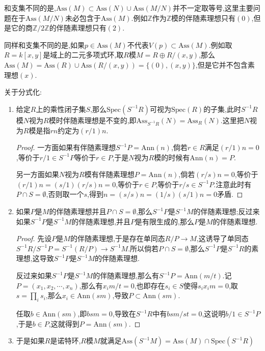 和支集不同的是,$\mathrm{Ass}(M)\subset\mathrm{Ass}(N)\cup\mathrm{Ass}(M/N)$并不一定取等号,这里主要问题在于$\mathrm{Ass}(M/N)$未必包含于$\mathrm{Ass}(M)$.例如$\mathbb{Z}$作为$\mathbb{Z}$模的伴随素理想只有$(0)$,但是它的商$\mathbb{Z}/2\mathbb{Z}$的伴随素理想只有$(2)$.

同样和支集不同的是,如果$p\in\mathrm{Ass}(M)$不代表$V(p)\subset\mathrm{Ass}(M)$.例如取$R=k[x,y]$是域上的二元多项式环,取$R$模$M=R\oplus R/(x,y)$,那么$\mathrm{Ass}(M)=\mathrm{Ass}(R)\cup\mathrm{Ass}(R/(x,y))=\{(0),(x,y)\}$,但是它并不包含素理想$(x)$.

关于分式化:
\begin{enumerate}
	\item 给定$R$上的乘性闭子集$S$,那么$\mathrm{Spec}(S^{-1}R)$可视为$\mathrm{Spec}(R)$的子集,此时$S^{-1}R$模$N$视为$R$模时伴随素理想是不变的,即$\mathrm{Ass}_{S^{-1}R}(N)=\mathrm{Ass}_R(N)$.这里把$N$视为$R$模是指$rn$约定为$(r/1)n$.
	\begin{proof}
		
		一方面如果有伴随素理想$S^{-1}P=\mathrm{Ann}(n)$,倘若$r\in R$满足$(r/1)n=0$,等价于$r/1\in S^{-1}P$等价于$r\in P$,于是$N$视为$R$模的时候有$\mathrm{Ann}(n)=P$.
		
		另一方面如果$N$视为$R$模有伴随素理想$P=\mathrm{Ann}(n)$,倘若$(r/s)n=0$,等价于$(r/1)n=(s/1)(r/s)n=0$,等价于$r\in P$,等价于$r/s\in S^{-1}P$.注意此时有$P\cap S=\emptyset$,否则取一个$s$,得到$n=(s/s)n=(1/s)(s/1)n=0$矛盾.
	\end{proof}
	\item 如果$P$是$M$的伴随素理想并且$P\cap S=\emptyset$,那么$S^{-1}P$是$S^{-1}M$的伴随素理想;反过来如果$S^{-1}P$是$S^{-1}M$的伴随素理想,并且$P$是有限生成的,那么$P$是$M$的伴随素理想.
	\begin{proof}
		
		先设$P$是$M$的伴随素理想,于是存在单同态$R/P\to M$,这诱导了单同态$S^{-1}R/S^{-1}P=S^{-1}(R/P)\to S^{-1}M$.所以倘若$P\cap S=\emptyset$,那么$S^{-1}P$是$S^{-1}R$的素理想,这导致$S^{-1}P$是$S^{-1}M$的伴随素理想.
		
		反过来如果$S^{-1}P$是$S^{-1}M$的伴随素理想,那么有$S^{-1}P=\mathrm{Ann}(m/t)$.记$P=(x_1,x_2,\cdots,x_n)$,那么有$x_im/t=0$,也即存在$s_i\in S$使得$s_ix_im=0$,取$s=\prod_is_i$,那么$x_i\in\mathrm{Ann}(sm)$,导致$P\subset\mathrm{Ann}(sm)$.
		
		任取$b\in\mathrm{Ann}(sm)$,即$bsm=0$,导致在$S^{-1}R$中有$bsm/st=0$,这说明$b/1\in S^{-1}P$,于是$b\in P$,这就得到$P=\mathrm{Ann}(sm)$.
	\end{proof}
	\item 于是如果$R$是诺特环,$R$模$M$就满足$\mathrm{Ass}(S^{-1}M)=\mathrm{Ass}(M)\cap\mathrm{Spec}(S^{-1}R)$
\end{enumerate}

